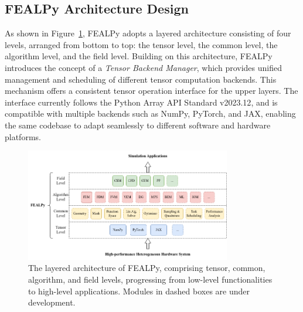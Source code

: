 \documentclass[mathpazo]{cicp}
\begin{document}
\subsection{FEALPy Architecture Design}
As shown in Figure~\ref{fs:fig1}, FEALPy adopts a layered architecture consisting of four levels, arranged from bottom to top: the tensor level, the common level, the algorithm level, and the field level. Building on this architecture, FEALPy introduces the concept of a \textit{Tensor Backend Manager}, which provides unified management and scheduling of different tensor computation backends. This mechanism offers a consistent tensor operation interface for the upper layers. The interface currently follows the Python Array API Standard v2023.12\cite{arrayapi2023}, and is compatible with multiple backends such as NumPy, PyTorch, and JAX, enabling the same codebase to adapt seamlessly to different software and hardware platforms.
\begin{figure}[htp]
	\centering
	\includegraphics[width=0.8\textwidth]{figures/fealpy_structure.png}
	\caption{The layered architecture of FEALPy, comprising tensor, common, algorithm, and field levels, progressing from low-level functionalities to high-level applications. Modules in dashed boxes are under development.}
	\label{fs:fig1}
\end{figure}
\end{document}
